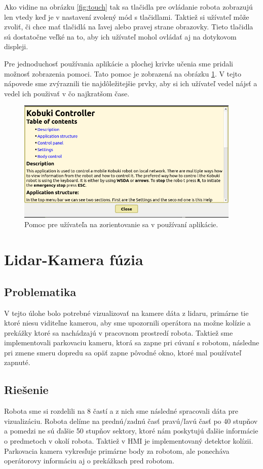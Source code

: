 Ako vidine na obrázku \ref{fig:touch} tak sa tlačidla pre ovládanie robota zobrazujú len vtedy keď je v nastavení
zvolený mód s tlačidlami. Taktiež si užívateľ môže zvoliť, či chce mať tlačidlá na ľavej alebo pravej strane obrazovky.
Tieto tlačidla sú dostatočne veľké na to, aby ich užívateľ mohol ovládať aj na dotykovom displeji.

Pre jednoduchosť používania aplikácie a plochej krivke učenia sme pridali možnosť zobrazenia pomoci.
Tato pomoc je zobrazená na obrázku \ref{fig:help}. V tejto nápovede sme zvýraznili tie najdôležitejšie prvky,
aby si ich užívateľ vedel nájsť a vedel ich použivať v čo najkratšom čase.

\begin{figure}[!htbp]
	\begin{center}
		\includegraphics[width=0.95\textwidth]{img/help.png}
	\end{center}
	\caption{Pomoc pre užívateľa na zorientovanie sa v používaní aplikácie.}
	\label{fig:help}
\end{figure}
\section{Lidar-Kamera fúzia}
\subsection{Problematika}
V tejto úlohe bolo potrebné vizualizovať na kamere dáta z lidaru, primárne tie ktoré niesu viditeľne kamerou, aby sme upozornili operátora na možne kolízie a prekážky ktoré sa nachádzajú v pracovnom prostredí robota. Taktiež sme implementovali parkovaciu kameru, ktorá sa zapne pri cúvaní s robotom, následne pri zmene smeru dopredu sa opäť zapne pôvodné okno, ktoré mal používateľ zapnuté.
\subsection{Riešenie}
Robota sme si rozdelili na 8 častí a z nich sme následné spracovali dáta pre vizualizáciu. Robota delíme na prednú/zadnú časť pravú/ľavú časť po 40 stupňov a pomedzi ne sú ďalšie 50 stupňov sektory, ktoré nám poskytujú ďalšie informácie o predmetoch v okolí robota. Taktiež v HMI je implementovaný detektor kolízii. Parkovacia kamera vykresľuje primárne body za robotom, ale ponecháva operátorovy informáciu aj o prekážkach pred robotom.
